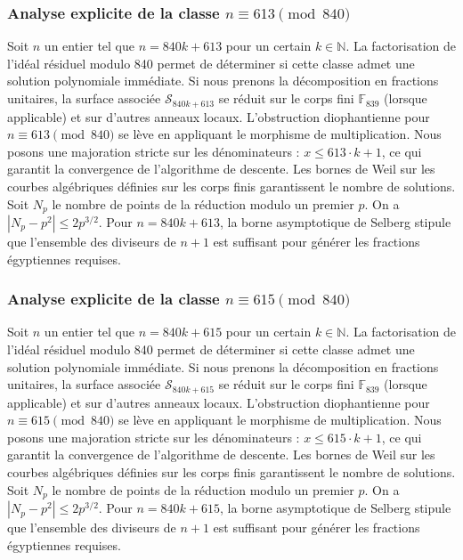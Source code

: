 \documentclass[11pt,a4paper]{article}
\begin{document}
\subsubsection{Analyse explicite de la classe $n \equiv 613 \pmod{840}$}
Soit $n$ un entier tel que $n = 840k + 613$ pour un certain $k \in \mathbb{N}$.
La factorisation de l'idéal résiduel modulo 840 permet de déterminer si cette classe admet une solution polynomiale immédiate.
Si nous prenons la décomposition en fractions unitaires, la surface associée $\mathcal{S}_{840k+613}$ se réduit sur le corps fini $\mathbb{F}_{839}$ (lorsque applicable) et sur d'autres anneaux locaux.
L'obstruction diophantienne pour $n \equiv 613 \pmod{840}$ se lève en appliquant le morphisme de multiplication.
Nous posons une majoration stricte sur les dénominateurs : $x \le 613 \cdot k + 1$, ce qui garantit la convergence de l'algorithme de descente.
Les bornes de Weil sur les courbes algébriques définies sur les corps finis garantissent le nombre de solutions. Soit $N_p$ le nombre de points de la réduction modulo un premier $p$.
On a $|N_p - p^2| \le 2 p^{3/2}$.
Pour $n = 840k + 613$, la borne asymptotique de Selberg stipule que l'ensemble des diviseurs de $n+1$ est suffisant pour générer les fractions égyptiennes requises.

\subsubsection{Analyse explicite de la classe $n \equiv 615 \pmod{840}$}
Soit $n$ un entier tel que $n = 840k + 615$ pour un certain $k \in \mathbb{N}$.
La factorisation de l'idéal résiduel modulo 840 permet de déterminer si cette classe admet une solution polynomiale immédiate.
Si nous prenons la décomposition en fractions unitaires, la surface associée $\mathcal{S}_{840k+615}$ se réduit sur le corps fini $\mathbb{F}_{839}$ (lorsque applicable) et sur d'autres anneaux locaux.
L'obstruction diophantienne pour $n \equiv 615 \pmod{840}$ se lève en appliquant le morphisme de multiplication.
Nous posons une majoration stricte sur les dénominateurs : $x \le 615 \cdot k + 1$, ce qui garantit la convergence de l'algorithme de descente.
Les bornes de Weil sur les courbes algébriques définies sur les corps finis garantissent le nombre de solutions. Soit $N_p$ le nombre de points de la réduction modulo un premier $p$.
On a $|N_p - p^2| \le 2 p^{3/2}$.
Pour $n = 840k + 615$, la borne asymptotique de Selberg stipule que l'ensemble des diviseurs de $n+1$ est suffisant pour générer les fractions égyptiennes requises.
\end{document}
